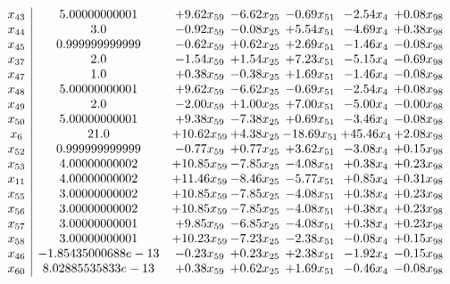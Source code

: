\documentclass[8pt]{article}
\begin{document}
\[\begin{array}{c| c c@{\hskip 2pt} c@{\hskip 2pt} c@{\hskip 2pt} c@{\hskip 2pt} c@{\hskip 2pt} }
 x_{43}   &  5.00000000001 & +  9.62 x_{59} & -6.62 x_{25} & -0.69 x_{51} & -2.54 x_{4} & +  0.08 x_{98}\\
 x_{44}   &  3.0 & -0.92 x_{59} & -0.08 x_{25} & +  5.54 x_{51} & -4.69 x_{4} & +  0.38 x_{98}\\
 x_{45}   &  0.999999999999 & -0.62 x_{59} & +  0.62 x_{25} & +  2.69 x_{51} & -1.46 x_{4} & -0.08 x_{98}\\
 x_{37}   &  2.0 & -1.54 x_{59} & +  1.54 x_{25} & +  7.23 x_{51} & -5.15 x_{4} & -0.69 x_{98}\\
 x_{47}   &  1.0 & +  0.38 x_{59} & -0.38 x_{25} & +  1.69 x_{51} & -1.46 x_{4} & -0.08 x_{98}\\
 x_{48}   &  5.00000000001 & +  9.62 x_{59} & -6.62 x_{25} & -0.69 x_{51} & -2.54 x_{4} & +  0.08 x_{98}\\
 x_{49}   &  2.0 & -2.00 x_{59} & +  1.00 x_{25} & +  7.00 x_{51} & -5.00 x_{4} & -0.00 x_{98}\\
 x_{50}   &  5.00000000001 & +  9.38 x_{59} & -7.38 x_{25} & +  0.69 x_{51} & -3.46 x_{4} & -0.08 x_{98}\\
 x_{6}   &  21.0 & + 10.62 x_{59} & +  4.38 x_{25} & -18.69 x_{51} & + 45.46 x_{4} & +  2.08 x_{98}\\
 x_{52}   &  0.999999999999 & -0.77 x_{59} & +  0.77 x_{25} & +  3.62 x_{51} & -3.08 x_{4} & +  0.15 x_{98}\\
 x_{53}   &  4.00000000002 & + 10.85 x_{59} & -7.85 x_{25} & -4.08 x_{51} & +  0.38 x_{4} & +  0.23 x_{98}\\
 x_{11}   &  4.00000000002 & + 11.46 x_{59} & -8.46 x_{25} & -5.77 x_{51} & +  0.85 x_{4} & +  0.31 x_{98}\\
 x_{55}   &  3.00000000002 & + 10.85 x_{59} & -7.85 x_{25} & -4.08 x_{51} & +  0.38 x_{4} & +  0.23 x_{98}\\
 x_{56}   &  3.00000000002 & + 10.85 x_{59} & -7.85 x_{25} & -4.08 x_{51} & +  0.38 x_{4} & +  0.23 x_{98}\\
 x_{57}   &  3.00000000001 & +  9.85 x_{59} & -6.85 x_{25} & -4.08 x_{51} & +  0.38 x_{4} & +  0.23 x_{98}\\
 x_{58}   &  3.00000000001 & + 10.23 x_{59} & -7.23 x_{25} & -2.38 x_{51} & -0.08 x_{4} & +  0.15 x_{98}\\
 x_{46}   &  -1.85435000688e-13 & -0.23 x_{59} & +  0.23 x_{25} & +  2.38 x_{51} & -1.92 x_{4} & -0.15 x_{98}\\
 x_{60}   &  8.02885535833e-13 & +  0.38 x_{59} & +  0.62 x_{25} & +  1.69 x_{51} & -0.46 x_{4} & -0.08 x_{98}\\

\end{array}\]
\end{document}

